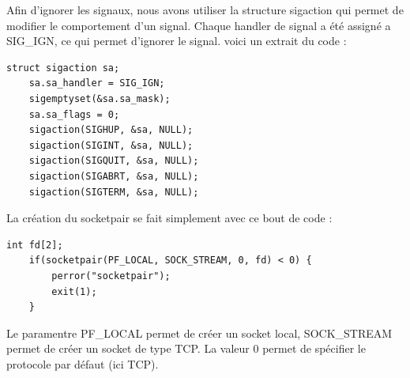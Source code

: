 \documentclass[
	a4paper, %
	10pt, %
]{CSUniSchoolLabReport}
\begin{document}
Afin d'ignorer les signaux, nous avons utiliser la structure sigaction qui permet de modifier le comportement d'un signal.
Chaque handler de signal a été assigné a SIG\_IGN, ce qui permet d'ignorer le signal.
voici un extrait du code :

\begin{lstlisting}[style=CStyle, firstnumber=1]
	struct sigaction sa;
	sa.sa_handler = SIG_IGN;
	sigemptyset(&sa.sa_mask);
	sa.sa_flags = 0;
	sigaction(SIGHUP, &sa, NULL);
	sigaction(SIGINT, &sa, NULL);
	sigaction(SIGQUIT, &sa, NULL);
	sigaction(SIGABRT, &sa, NULL);
	sigaction(SIGTERM, &sa, NULL);
\end{lstlisting}
La création du socketpair se fait simplement avec ce bout de code :
\begin{lstlisting}[style=CStyle, firstnumber=1]
	int fd[2];
    if(socketpair(PF_LOCAL, SOCK_STREAM, 0, fd) < 0) {
        perror("socketpair");
        exit(1);
    }
\end{lstlisting}
Le paramentre PF\_LOCAL permet de créer un socket local, SOCK\_STREAM permet de créer un socket de type TCP. La valeur 0 permet de spécifier le protocole par défaut (ici TCP).
\end{document}

